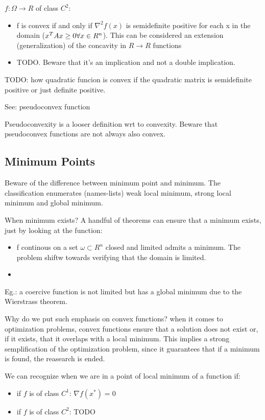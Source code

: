$f: \Omega \rightarrow R$ of class $C^2$:
\begin{itemize}
  \item f is convex if and only if $\nabla^2 f(x)$ is semidefinite positive for each x in the domain ($x^T A x \geq 0 \space \forall x \in R^n$). This can be considered an extension (generalization) of the concavity in $R \rightarrow R$ functions
  \item TODO. Beware that it's an implication and not a double implication.
\end{itemize}

TODO: how quadratic funcion is convex if the quadratic matrix is semidefinite positive or just definite positive.

See: pseudoconvex function

Pseudoconvexity is a looser definition wrt to convexity. Beware that pseudoconvex functions are not always also convex.

\subsection{Minimum Points}
Beware of the difference between minimum point and minimum. The classification enumerates (names-lists) weak local minimum, strong local minimum and global minimum.

When minimum exists? A handful of theorems can ensure that a minimum exists, just by looking at the function:
\begin{itemize}
  \item f continous on a set $\omega \subset R^n$ closed and limited admits a minimum. The problem shiftw towards verifying that the domain is limited.
  \item
\end{itemize}

Eg.: a coercive function is not limited but has a global minimum due to the Wierstrass theorem.

Why do we put such emphasis on convex functions?
when it comes to optimization problems, convex functions ensure that a solution does not exist or, if it exists, that it overlaps with a local minimum.
This implies a strong semplification of the optimization problem, since it guarantees that if a minimum is found, the reasearch is ended.

We can recognize when we are in a point of local minimum of a function if:
\begin{itemize}
  \item if $f$ is of class $C^1$: $\nabla f(x^*) = 0$
  \item if $f$ is of class $C^2$: TODO
\end{itemize}

